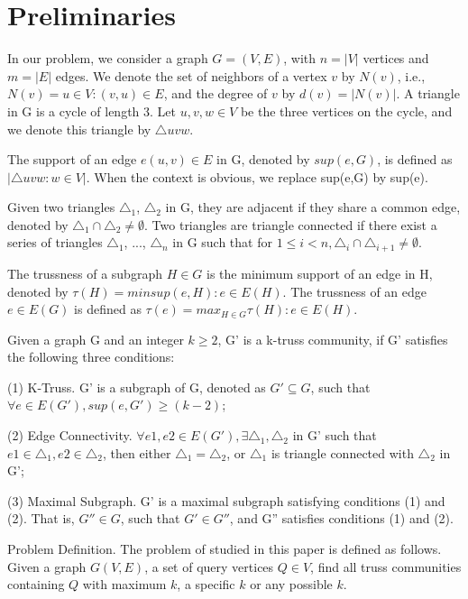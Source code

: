 \section{Preliminaries}
\label{preliminary}

In our problem, we consider a graph $G = (V,E)$, with $n = |V|$ vertices and $m = |E|
$ edges. We denote the set of neighbors of a vertex $v$ by $N(v)$, i.e., $N(v)= {u \in V :(v, u) \in E}$, and the degree of $v$ by $d(v)= |N(v)|$. A triangle in G is a cycle of length 3. Let $u, v, w \in V$ be the three vertices on the cycle, and we denote this triangle by $\triangle uvw$.

The support of an edge $e(u, v) \in E$ in G, denoted by $sup(e,G)$, is defined as $|{\triangle uvw : w \in V}|$. When the context is obvious, we replace sup(e,G) by sup(e).

Given two triangles ${\triangle}_{1}$, ${\triangle}_{2}$ in G, they are adjacent if they share a common edge, denoted by ${\triangle}_{1} \cap {\triangle}_{2} \neq \emptyset$. Two triangles are triangle connected if there exist a series of triangles ${\triangle}_{1}$, ..., ${\triangle}_{n}$ in G such that for $1 \le i < n, {\triangle}_{i} \cap {\triangle}_{i+1} \neq \emptyset$.

The trussness of a subgraph $H \in G$ is the minimum support of an edge in H, denoted by $\tau(H) = min{sup(e,H): e \in E(H)}$.  The trussness of an edge $e \in E(G)$ is defined as $\tau(e)=max_{H \in G}{τ(H): e \in E(H)}$. %

Given a graph G and an integer $k \ge 2$, G' is a k-truss community, if G' satisfies the following three conditions: 

(1) K-Truss. G' is a subgraph of G, denoted as $G' \subseteq G$, such that $\forall e \in E(G'), sup(e,G') ≥ (k − 2)$;

(2) Edge Connectivity. $\forall e1,e2 \in E(G'), \exists {\triangle}_{1}, {\triangle}_{2}$ in G' such that $e1 \in {\triangle}_{1}, e2 \in {\triangle}_{2}$, then either ${\triangle}_{1} = {\triangle}_{2}$, or ${\triangle}_{1}$ is triangle connected with ${\triangle}_{2}$ in G';

(3) Maximal Subgraph. G' is a maximal subgraph satisfying conditions (1) and (2). That is, $G'' \in G$, such that $G' \in G''$, and G'' satisfies conditions (1) and (2).

Problem Definition. The problem of studied in this paper is defined as follows. Given a graph $G(V,E)$, a set of query vertices $Q \in V$, find all truss communities containing $Q$ with maximum $k$, a specific $k$ or any possible $k$. 